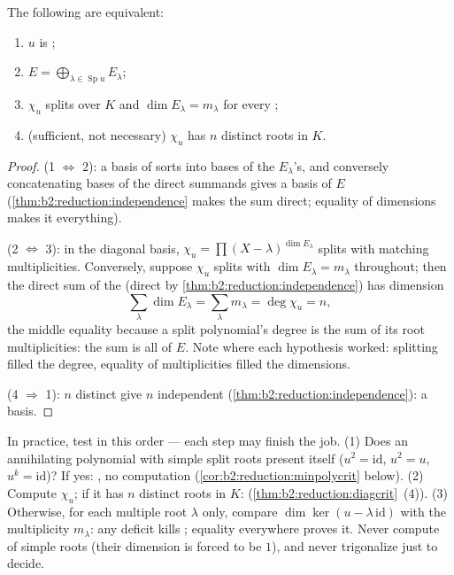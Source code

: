 \begin{theorem}\label{thm:b2:reduction:diagcrit}
The following are equivalent:
\begin{enumerate}
  \item $u$ is ;
  \item $E = \bigoplus_{\lambda \in \operatorname{Sp} u} E_\lambda$;
  \item $\chi_u$ splits over $K$ and $\dim E_\lambda = m_\lambda$
        for every ;
  \item (sufficient, not necessary) $\chi_u$ has $n$ distinct roots
        in $K$.
\end{enumerate}
\end{theorem}

\begin{proof}
(1 $\iff$ 2): a basis of  sorts into bases of the
$E_\lambda$'s, and conversely concatenating bases of the direct
summands gives a basis of $E$
(\cref{thm:b2:reduction:independence} makes the sum direct; equality
of dimensions makes it everything).

(2 $\iff$ 3): in the diagonal basis, $\chi_u = \prod (X -
\lambda)^{\dim E_\lambda}$ splits with matching multiplicities.
Conversely, suppose $\chi_u$ splits with $\dim E_\lambda =
m_\lambda$ throughout; then the direct sum of the 
(direct by \cref{thm:b2:reduction:independence}) has dimension
\[
\sum_{\lambda}\dim E_\lambda = \sum_{\lambda} m_\lambda =
\deg\chi_u = n ,
\]
the middle equality because a split polynomial's degree is the
sum of its root multiplicities: the sum is all of $E$. Note
where each hypothesis worked: splitting filled the degree,
equality of multiplicities filled the dimensions.

(4 $\Rightarrow$ 1): $n$ distinct  give $n$ independent
 (\cref{thm:b2:reduction:independence}): a basis.
\end{proof}

\begin{method}\label{met:b2:reduction:decide}
In practice, test in this order --- each step may finish the
job. (1) Does an annihilating polynomial with simple split
roots present itself ($u^2 = \mathrm{id}$, $u^2 = u$, $u^k =
\mathrm{id}$)? If yes: , no computation
(\cref{cor:b2:reduction:minpolycrit} below). (2) Compute
$\chi_u$; if it has $n$ distinct roots in $K$: 
(\cref{thm:b2:reduction:diagcrit}~(4)). (3) Otherwise, for each
multiple root $\lambda$ only, compare $\dim\ker(u -
\lambda\,\mathrm{id})$ with the multiplicity $m_\lambda$: any
deficit kills ; equality everywhere proves it.
Never compute  of simple roots (their dimension is
forced to be $1$), and never trigonalize just to decide.
\end{method}

